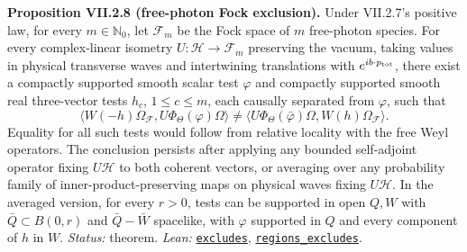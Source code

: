 \documentclass[
  letterpaper,
  11pt]{article}
\begin{document}
\textbf{Proposition VII.2.8 (free-photon Fock exclusion).} Under
VII.2.7's positive law, for every \(m\in\mathbb N_0\), let
\(\mathcal F_m\) be the Fock space of \(m\) free-photon species. For
every complex-linear isometry \(U:\mathcal H\to\mathcal F_m\) preserving
the vacuum, taking values in physical transverse waves and intertwining
translations with \(e^{ib\cdot p_{\rm tot}}\), there exist a compactly
supported smooth scalar test \(\varphi\) and compactly supported smooth
real three-vector tests \(h_c\), \(1\le c\le m\), each causally
separated from \(\varphi\), such that
\[\langle W(-h)\Omega_{\mathcal F},U\Phi_\Theta(\varphi)\Omega\rangle\ne\langle U\Phi_\Theta(\bar\varphi)\Omega,W(h)\Omega_{\mathcal F}\rangle.\]
Equality for all such tests would follow from relative locality with the
free Weyl operators. The conclusion persists after applying any bounded
self-adjoint operator fixing \(U\mathcal H\) to both coherent vectors,
or averaging over any probability family of inner-product-preserving
maps on physical waves fixing \(U\mathcal H\). In the averaged version,
for every \(r>0\), tests can be supported in open \(Q,W\) with
\(\bar Q\subset B(0,r)\) and \(\bar Q-\bar W\) spacelike, with
\(\varphi\) supported in \(Q\) and every component of \(h\) in \(W\).
\emph{Status:} theorem. \emph{Lean:}
\href{https://github.com/yang-mills-group/OpenAI-YM-20261028/blob/3456e5e75cf8d4cd558955a5c7638fba2d68f464/YM/TraceExtension/Fock/Conclude.lean\#L46-L49}{\texttt{excludes}},
\href{https://github.com/yang-mills-group/OpenAI-YM-20261028/blob/3456e5e75cf8d4cd558955a5c7638fba2d68f464/YM/TraceExtension/Fock/Regions.lean\#L36-L38}{\texttt{regions\_excludes}}.
\end{document}

